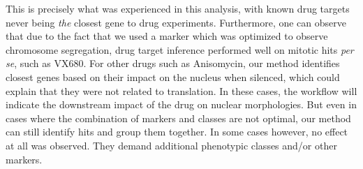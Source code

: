 This is precisely what was experienced in this analysis, with known
drug targets never being \textit{the} closest gene to drug
experiments. Furthermore, one can observe that due to the fact that we
used a marker which was optimized to observe chromosome segregation, drug target
inference performed well on mitotic hits \textit{per se}, such as
VX680. For other drugs such as Anisomycin, our method identifies
closest genes based on their impact on the nucleus when silenced,
which could explain that they were not related to translation. In
these cases, the workflow will indicate the downstream impact of the
drug on nuclear morphologies. But even in cases where the
combination of markers and classes are not optimal, our method can
still identify hits and group them together. In some cases however,
no effect at all was observed. They demand additional phenotypic classes and/or other markers. 


